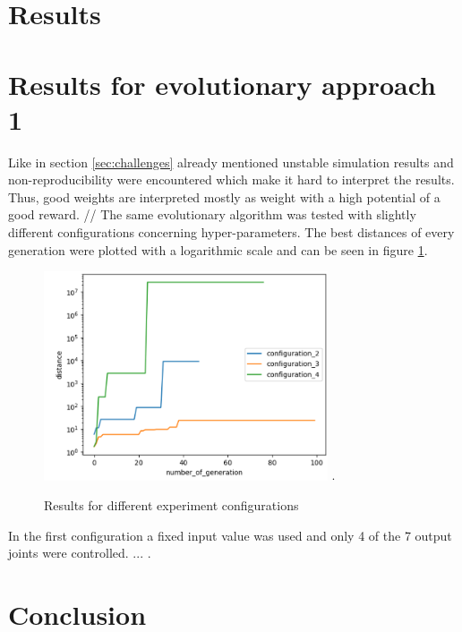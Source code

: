 \section{Results}
\label{sec:results}

\section{Results for evolutionary approach 1}
\label{sec:results_1}

Like in section \ref{sec:challenges} already mentioned unstable simulation results and non-reproducibility were encountered which make it hard to interpret the results. Thus, good weights are interpreted mostly as weight with a high potential of a good reward. //
The same evolutionary algorithm was tested with slightly different configurations concerning hyper-parameters. 
The best distances of every generation were plotted with a logarithmic scale and can be seen in figure \ref{fig:results_1}. 

\begin{figure}[H]
	\centering
	\includegraphics[width=3.3in]{img/results_1.png}
	\DeclareGraphicsExtensions.
	\caption{Results for different experiment configurations}
	\label{fig:results_1}
\end{figure}

In the first configuration a fixed input value was used and only 4 of the 7 output joints were controlled. ...
.
\section{Conclusion}